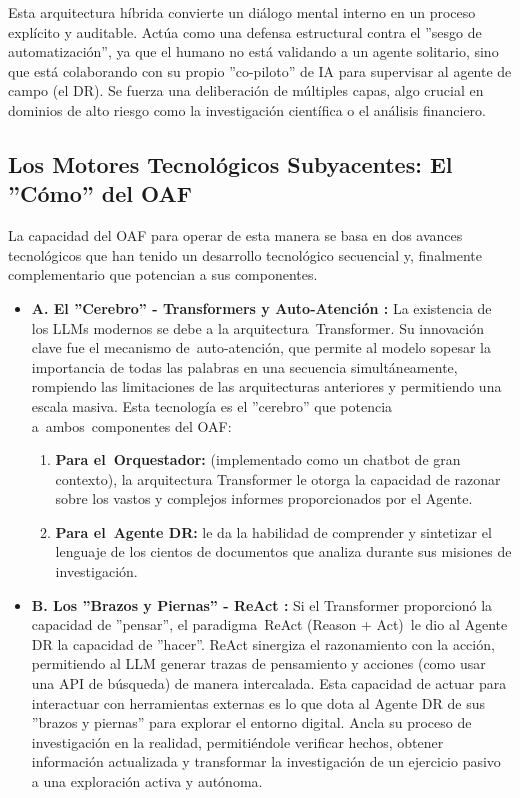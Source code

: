 \documentclass[11pt, a4paper]{article}
\begin{document}
Esta arquitectura híbrida convierte un diálogo mental interno en un proceso explícito y auditable. Actúa como una defensa estructural contra el ''sesgo de automatización'', ya que el humano no está validando a un agente solitario, sino que está colaborando con su propio ''co-piloto'' de IA para supervisar al agente de campo (el DR). Se fuerza una deliberación de múltiples capas, algo crucial en dominios de alto riesgo como la investigación científica o el análisis financiero.
\subsection{Los Motores Tecnológicos Subyacentes: El ''Cómo'' del OAF}
La capacidad del OAF para operar de esta manera se basa en dos avances tecnológicos que han tenido un desarrollo tecnológico secuencial y, finalmente complementario que potencian a sus componentes.\begin{itemize}
    \item \textbf{A. El ''Cerebro'' - Transformers y Auto-Atención \cite{vaswani2017}:} La existencia de los LLMs modernos se debe a la arquitectura Transformer. Su innovación clave fue el mecanismo de auto-atención, que permite al modelo sopesar la importancia de todas las palabras en una secuencia simultáneamente, rompiendo las limitaciones de las arquitecturas anteriores y permitiendo una escala masiva. Esta tecnología es el ''cerebro'' que potencia a ambos componentes del OAF:
    \begin{enumerate}
        \item \textbf{Para el Orquestador:} (implementado como un chatbot de gran contexto), la arquitectura Transformer le otorga la capacidad de razonar sobre los vastos y complejos informes proporcionados por el Agente.
        \item \textbf{Para el Agente DR:} le da la habilidad de comprender y sintetizar el lenguaje de los cientos de documentos que analiza durante sus misiones de investigación.
    \end{enumerate}
    \item \textbf{B. Los ''Brazos y Piernas'' - ReAct \cite{yao2022}:} Si el Transformer proporcionó la capacidad de ''pensar'', el paradigma ReAct (Reason + Act) le dio al Agente DR la capacidad de ''hacer''. ReAct sinergiza el razonamiento con la acción, permitiendo al LLM generar trazas de pensamiento y acciones (como usar una API de búsqueda) de manera intercalada. Esta capacidad de actuar para interactuar con herramientas externas es lo que dota al Agente DR de sus ''brazos y piernas'' para explorar el entorno digital. Ancla su proceso de investigación en la realidad, permitiéndole verificar hechos, obtener información actualizada y transformar la investigación de un ejercicio pasivo a una exploración activa y autónoma.
\end{itemize}
\end{document}
